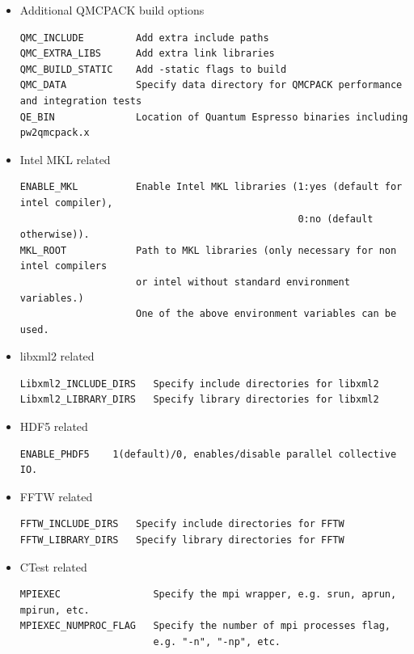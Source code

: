 \begin{itemize}
\item Additional QMCPACK build options
\verbatimfont{\footnotesize}
\begin{verbatim}
QMC_INCLUDE         Add extra include paths
QMC_EXTRA_LIBS      Add extra link libraries
QMC_BUILD_STATIC    Add -static flags to build
QMC_DATA            Specify data directory for QMCPACK performance and integration tests
QE_BIN              Location of Quantum Espresso binaries including pw2qmcpack.x
\end{verbatim}

\item Intel MKL related
\verbatimfont{\footnotesize}%
\begin{verbatim}
ENABLE_MKL          Enable Intel MKL libraries (1:yes (default for intel compiler),
                                                0:no (default otherwise)).
MKL_ROOT            Path to MKL libraries (only necessary for non intel compilers
                    or intel without standard environment variables.)
                    One of the above environment variables can be used.
\end{verbatim}

\item libxml2 related
\verbatimfont{\footnotesize}%
\begin{verbatim}
Libxml2_INCLUDE_DIRS   Specify include directories for libxml2
Libxml2_LIBRARY_DIRS   Specify library directories for libxml2
\end{verbatim}

\item HDF5 related
\verbatimfont{\footnotesize}%
\begin{verbatim}
ENABLE_PHDF5    1(default)/0, enables/disable parallel collective IO.
\end{verbatim}

\item FFTW related
\verbatimfont{\footnotesize}%
\begin{verbatim}
FFTW_INCLUDE_DIRS   Specify include directories for FFTW
FFTW_LIBRARY_DIRS   Specify library directories for FFTW
\end{verbatim}

\item CTest related
\verbatimfont{\footnotesize}%
\begin{verbatim}
MPIEXEC                Specify the mpi wrapper, e.g. srun, aprun, mpirun, etc.
MPIEXEC_NUMPROC_FLAG   Specify the number of mpi processes flag,
                       e.g. "-n", "-np", etc.
\end{verbatim}

\end{itemize}

